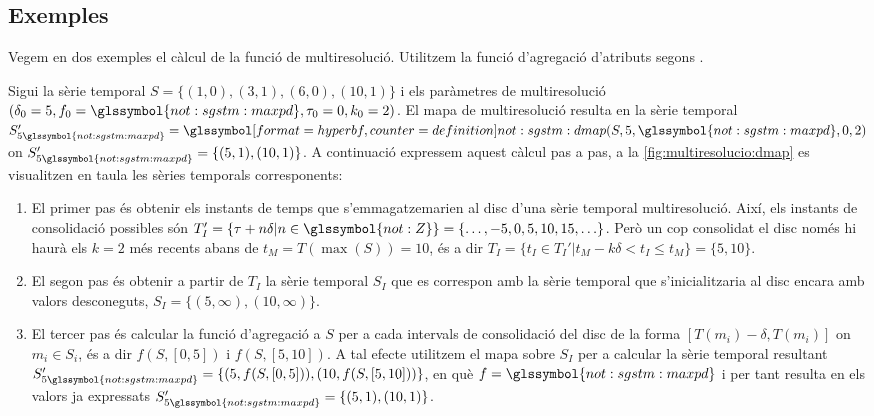 \subsection{Exemples}

Vegem en dos exemples el càlcul de la funció de multiresolució.
Utilitzem la funció d'agregació d'atributs 
segons .


\begin{example}
  \label{ex:multiresolucio:dmap}
  Sigui la sèrie temporal $S=\{(1,0),(3,1),(6,0),(10,1)\}$ i els
  paràmetres de multiresolució
  $(\delta_0=5,f_0=\glssymbol{not:sgstm:maxpd},\tau_0=0,k_0=2)$.  El
  mapa de multiresolució resulta en la sèrie temporal
  $S_{5\glssymbol{not:sgstm:maxpd}}'=
  \glssymboldef{not:sgstm:dmap}(S,5,\glssymbol{not:sgstm:maxpd},0,2)$
  on $S'_{5\glssymbol{not:sgstm:maxpd}}=\{(5,1),(10,1)\}$. A
  continuació expressem aquest càlcul pas a pas, a la
  \autoref{fig:multiresolucio:dmap} es visualitzen en taula les sèries
  temporals corresponents:
  \begin{enumerate}
  \item El primer pas és obtenir els instants de temps que
    s'emmagatzemarien al disc d'una sèrie temporal
    multiresolució. Així, els instants de consolidació possibles són
    $T_I'=\{\tau+n\delta|n\in\glssymbol{not:Z}\}=
    \{\ldots,-5,0,5,10,15,\ldots\}$. Però un cop consolidat el disc
    només hi haurà els $k=2$ més recents abans de $t_M=T(\max(S))=10$,
    és a dir $T_I=\{t_I\in T_I'|t_M - k\delta < t_I \leq
    t_M\}=\{5,10\}$.

  \item El segon pas és obtenir a partir de $T_I$ la sèrie temporal
    $S_I$ que es correspon amb la sèrie temporal que s'inicialitzaria
    al disc encara amb valors desconeguts,
    $S_I=\{(5,\infty),(10,\infty)\}$.



  \item El tercer pas és calcular la funció d'agregació a $S$ per a
    cada intervals de consolidació del disc de la forma
    $[T(m_i)-\delta,T(m_i)]$ on $m_i\in S_i$, és a dir $f(S,[0,5])$ i
    $f(S,[5,10])$. A tal efecte utilitzem el mapa sobre $S_I$ per a
    calcular la sèrie temporal resultant
    $S'_{5\glssymbol{not:sgstm:maxpd}}=\{ (5,f(S,[0,5])),
    (10,f(S,[5,10])) \}$, en què $f=\glssymbol{not:sgstm:maxpd}$ i per
    tant resulta en els valors ja expressats
    $S'_{5\glssymbol{not:sgstm:maxpd}}=\{(5,1),(10,1)\}$.


\end{enumerate}
\end{example}
